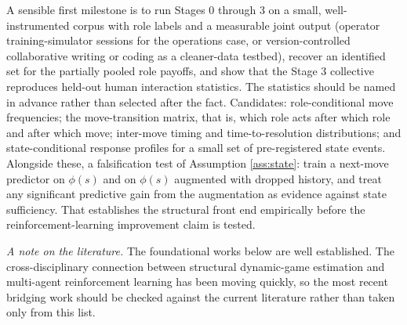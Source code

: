 \documentclass[11pt]{article}
\theoremstyle{definition}
\begin{document}
A sensible first milestone is to run Stages 0 through 3 on a small, well-instrumented corpus with role labels and a measurable joint output (operator training-simulator sessions for the operations case, or version-controlled collaborative writing or coding as a cleaner-data testbed), recover an identified set for the partially pooled role payoffs, and show that the Stage 3 collective reproduces held-out human interaction statistics. The statistics should be named in advance rather than selected after the fact. Candidates: role-conditional move frequencies; the move-transition matrix, that is, which role acts after which role and after which move; inter-move timing and time-to-resolution distributions; and state-conditional response profiles for a small set of pre-registered state events. Alongside these, a falsification test of Assumption \ref{ass:state}: train a next-move predictor on $\phi(s)$ and on $\phi(s)$ augmented with dropped history, and treat any significant predictive gain from the augmentation as evidence against state sufficiency. That establishes the structural front end empirically before the reinforcement-learning improvement claim is tested.

\bigskip
\noindent\emph{A note on the literature.} The foundational works below are well established. The cross-disciplinary connection between structural dynamic-game estimation and multi-agent reinforcement learning has been moving quickly, so the most recent bridging work should be checked against the current literature rather than taken only from this list.
\end{document}
